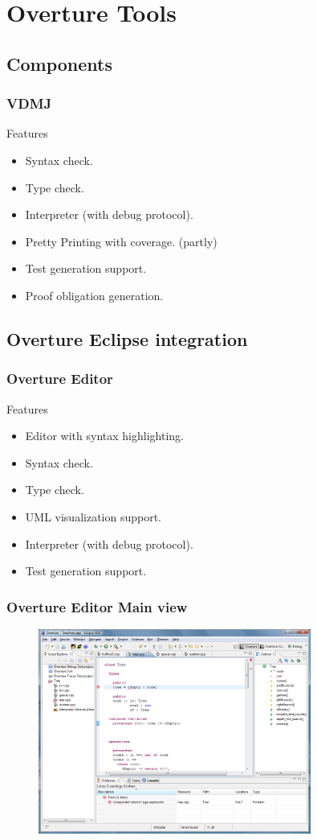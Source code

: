 \documentclass[slidestop,uncompress,mathserif,notes]{beamer}
\begin{document}
\section{Overture Tools}


\subsection{Components}
\frame
{
  \frametitle{VDMJ}

  \begin{block}{Features}
	{\scriptsize\begin{itemize}
	  \item Syntax check.      
	  \item Type check.
	  \item Interpreter (with debug protocol).
	  \item Pretty Printing with coverage. (partly)
	  \item Test generation support.
	  \item Proof obligation generation.
  \end{itemize}}
  \end{block}
}


\subsection{Overture Eclipse integration}
\frame
{
  \frametitle{Overture Editor}

  \begin{block}{Features}
	{\scriptsize\begin{itemize}
	  \item Editor with syntax highlighting.
	  \item Syntax check.      
	  \item Type check.
	  \item UML visualization support.
	  \item Interpreter (with debug protocol).
	  \item Test generation support.
  \end{itemize}}
  \end{block}
}

\frame
{
  \frametitle{Overture Editor Main view}

\begin{figure}[t]
\centering
\includegraphics[width=0.8\textwidth]{images/EditorOverview}
\label{fig:}
\end{figure}
}
\end{document}
